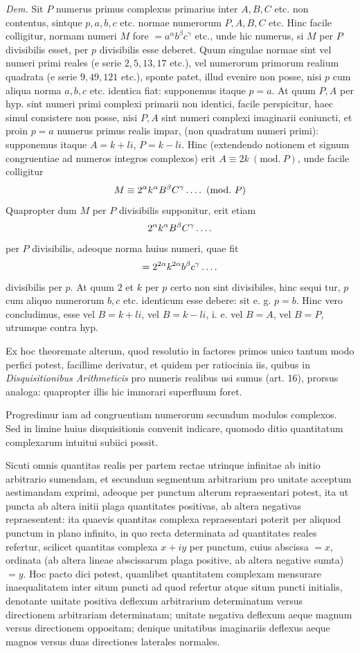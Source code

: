 \emph{Dem.} Sit $P$ numerus primus complexus primarius inter $A,B,C$ etc. non contentus, sintque $p,a,b,c$ etc. normae numerorum $P,A,B,C$ etc. Hinc facile colligitur, normam numeri $M$ fore $=a^\alpha b^\beta c^\gamma$ etc., unde hic numerus, si $M$ per $P$ divisibilis esset, per $p$ divisibilis esse deberet. Quum singulae normae sint vel numeri primi reales (e serie $2,5,13,17$ etc.), vel numerorum primorum realium quadrata (e serie $9,49,121$ etc.), sponte patet, illud evenire non posse, nisi $p$ cum aliqua norma $a,b,c$ etc. identica fiat: supponemus itaque $p=a$. At quum $P,A$ per hyp. sint numeri primi complexi primarii non identici, facile perspicitur, haec simul consistere non posse, nisi $P,A$ sint numeri complexi imaginarii coniuncti, et proin $p=a$ numerus primus realis impar, (non quadratum numeri primi): supponemus itaque $A=k+li$, $P=k-li$. Hinc (extendendo notionem et signum congruentiae ad numeros integros complexos) erit $A\equiv2k\ (\mathrm{mod.}\ P)$, unde facile colligitur
\[
M\equiv2^\alpha k^\alpha B^\beta C^\gamma\mathinner{.\,.\,.\,.}\ (\mathrm{mod.}\ P)
\]
Quapropter dum $M$ per $P$ divisibilis supponitur, erit etiam
\[
2^\alpha k^\alpha B^\beta C^\gamma\mathinner{.\,.\,.\,.}
\]
per $P$ divisibilis, adeoque norma huius numeri, quae fit
\[
=2^{2\alpha}k^{2\alpha}b^\beta c^\gamma\mathinner{.\,.\,.\,.}
\]
divisibilis per $p$. At quum $2$ et $k$ per $p$ certo non sint divisibiles, hinc sequi%
%
tur, $p$ cum aliquo numerorum $b,c$ etc. identicum esse debere: sit e. g. $p=b$. Hinc vero concludimus, esse vel $B=k+li$, vel $B=k-li$, i. e. vel $B=A$, vel $B=P$, utrumque contra hyp.

Ex hoc theoremate alterum, quod resolutio in factores primos unico tantum modo perfici potest, facillime derivatur, et quidem per ratiocinia iis, quibus in \emph{Disquisitionibus Arithmeticis} pro numeris realibus usi sumus (art. 16), prorsus analoga: quapropter illis hic immorari superfluum foret.

Progredimur iam ad congruentiam numerorum secundum modulos complexos. Sed in limine huius disquisitionis convenit indicare, quomodo ditio quantitatum complexarum intuitui subiici possit.

Sicuti omnis quantitas realis per partem rectae utrinque infinitae ab initio arbitrario sumendam, et secundum segmentum arbitrarium pro unitate acceptum aestimandam exprimi, adeoque per punctum alterum repraesentari potest, ita ut puncta ab altera initii plaga quantitates positivas, ab altera negativas repraesentent: ita quaevis quantitas complexa repraesentari poterit per aliquod punctum in plano infinito, in quo recta determinata ad quantitates reales refertur, scilicet quantitas complexa $x+iy$ per punctum, cuius abscissa $=x$, ordinata (ab altera lineae abscissarum plaga positive, ab altera negative sumta) $=y$. Hoc pacto dici potest, quamlibet quantitatem complexam mensurare inaequalitatem inter situm puncti ad quod refertur atque situm puncti initialis, denotante unitate positiva deflexum arbitrarium determinatum versus directionem arbitrariam determinatam; unitate negativa deflexum aeque magnum versus directionem oppositam; denique unitatibus imaginariis deflexus aeque magnos versus duas directiones laterales normales.

